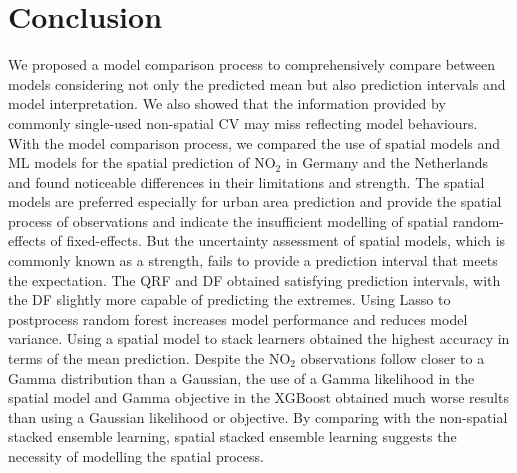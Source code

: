 \documentclass{article}
\begin{document}
\section{Conclusion}
We proposed a model comparison process to comprehensively compare between models considering not only the predicted mean but also prediction intervals and model interpretation. We also showed that the information provided by commonly single-used non-spatial CV may miss reflecting model behaviours. With the model comparison process, we compared the use of spatial models and ML models for the spatial prediction of NO$_2$ in Germany and the Netherlands and found noticeable differences in their limitations and strength. The  spatial models are preferred especially for urban area prediction and provide the spatial process of observations and indicate the insufficient modelling of spatial random-effects of fixed-effects. But the uncertainty assessment of spatial models, which is commonly known as a strength, fails to provide a prediction interval that meets the expectation. The QRF and DF obtained satisfying prediction intervals, with the DF slightly more capable of predicting the extremes. Using Lasso to postprocess random forest increases model performance and reduces model variance. Using a spatial model to stack learners obtained the highest accuracy in terms of the mean prediction. Despite the NO$_2$ observations follow closer to a Gamma distribution than a Gaussian, the use of a Gamma likelihood in the spatial model and Gamma objective in the XGBoost obtained much worse results than using a Gaussian likelihood or objective. By comparing with the non-spatial stacked ensemble learning, spatial stacked ensemble learning suggests the necessity of modelling the spatial process.  

\newpage



\end{document}
